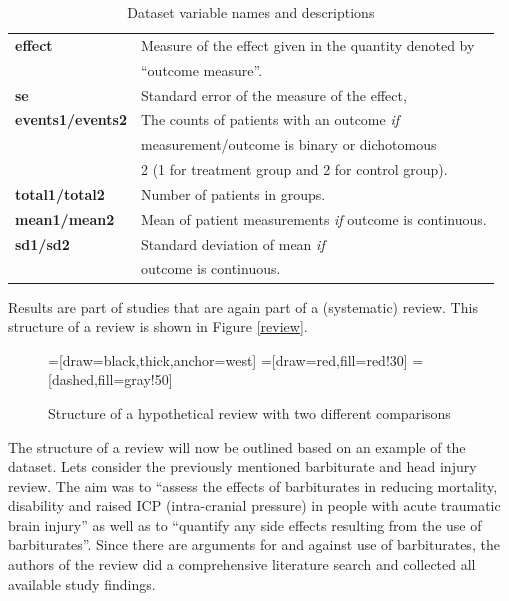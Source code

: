 \documentclass[11pt,a4paper,twoside]{book}\usepackage[]{graphicx}\usepackage[]{color}
\begin{document}
\begin{table}[ht]
\begin{center}
\begin{tabular}{l l}
      \textbf{effect} & Measure of the effect given in the quantity denoted by \\ &``outcome measure''.\\
      \textbf{se} & Standard error of the measure of the effect,\\
      \textbf{events1/events2} & The counts of patients with an outcome \textit{if}\\ &measurement/outcome is binary or dichotomous \\ &2 (1 for treatment group and 2 for control group).\\
      \textbf{total1/total2} & Number of patients in groups.\\
      \textbf{mean1/mean2} & Mean of patient measurements \textit{if} outcome is continuous.\\
      \textbf{sd1/sd2} & Standard deviation of mean \textit{if} \\ &outcome is continuous.
    \end{tabular}
  \caption{Dataset variable names and descriptions  \label{variable}}

  \end{center}
\end{table}

Results are part of studies that are again part of a (systematic) review. This structure of a review is shown in Figure \ref{review}. 

\begin{figure}
=[draw=black,thick,anchor=west]
=[draw=red,fill=red!30]
=[dashed,fill=gray!50]
\caption{Structure of a hypothetical review with two different comparisons\label{review.structure}}
\label{review.structure}
\end{figure}

\vspace{0mm}
The structure of a review will now be outlined based on an example of the dataset. Lets consider the previously mentioned barbiturate and head injury review. The aim was to ``assess the effects of barbiturates in reducing mortality, disability and raised ICP (intra-cranial pressure) in people with acute traumatic brain injury'' as well as to ``quantify any side effects resulting from the use of barbiturates''. Since there are arguments for and against use of barbiturates, the authors of the review did a comprehensive literature search and collected all available study findings.
\end{document}

